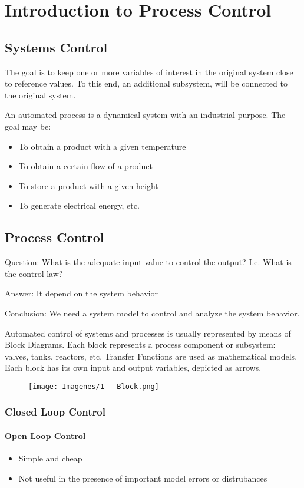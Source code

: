 \chapter{Introduction to Process Control}
\section{Systems Control}
The goal is to keep one or more variables of interest in the original system close to reference values. To this end, an additional subsystem, will be connected to the original system.

An automated process is a dynamical system with an industrial purpose. The goal may be:
\begin{itemize}
    \item To obtain a product with a given temperature
    \item To obtain a certain flow of a product
    \item To store a product with a given height
    \item To generate electrical energy, etc.
\end{itemize}

\section{Process Control}

Question: What is the adequate input value to control the output? I.e. What is the control law?

Answer: It depend on the system behavior

Conclusion: We need a system model to control and analyze the system behavior.

Automated control of systems and processes is usually represented by means of Block Diagrams. Each block represents a process component or subsystem: valves, tanks, reactors, etc. Transfer Functions are used as mathematical models. Each block has its own input and output variables, depicted as arrows.

\begin{figure}[H]
    \centering
    \texttt{[image: Imagenes/1 - Block.png]}
    \label{Fig: 1 - Block}
\end{figure}

\subsection{Closed Loop Control}
\subsubsection{Open Loop Control}
\begin{itemize}
    \item Simple and cheap
    \item Not useful in the presence of important model errors or distrubances
\end{itemize}

